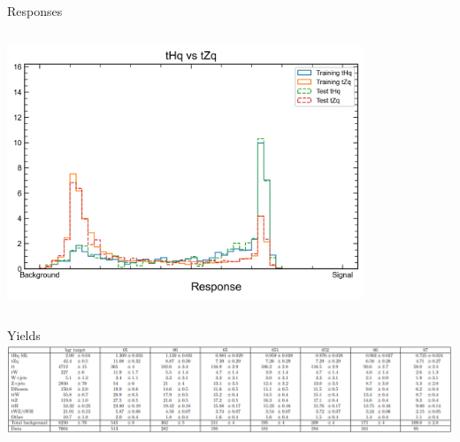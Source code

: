 \begin{frame}{Responses}
\begin{columns}
\begin{column}{0.5\textwidth}
            \includegraphics[width=0.8\textwidth]{comparison_lephad}
        \end{column}
    \end{columns}
\end{frame}

\begin{frame}{Yields}
    \includegraphics[width=\textwidth]{yields}
\end{frame}

